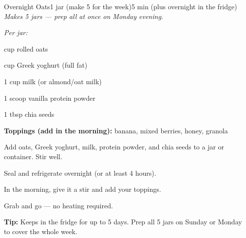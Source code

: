\begin{recipebox}{Overnight Oats}{1 jar (make 5 for the week)}{5 min (plus overnight in the fridge)}
\textit{Makes 5 jars --- prep all at once on Monday evening.}

\begin{ingredients}
  \item[] \textit{Per jar:}
  \item \textonehalf{} cup rolled oats
  \item \textonehalf{} cup Greek yoghurt (full fat)
  \item 1 cup milk (or almond/oat milk)
  \item 1 scoop vanilla protein powder
  \item 1 tbsp chia seeds
  \item \textbf{Toppings (add in the morning):} banana, mixed berries, honey, granola
\end{ingredients}

\begin{method}
  \item Add oats, Greek yoghurt, milk, protein powder, and chia seeds to a jar or container. Stir well.
  \item Seal and refrigerate overnight (or at least 4 hours).
  \item In the morning, give it a stir and add your toppings.
  \item Grab and go --- no heating required.
\end{method}

\begin{notelist}
  \item \textbf{Tip:} Keeps in the fridge for up to 5 days. Prep all 5 jars on Sunday or Monday to cover the whole week.
\end{notelist}
\end{recipebox}
